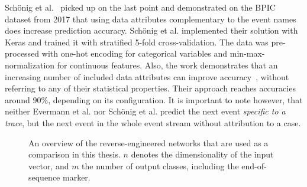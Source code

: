 Schönig et al.~\cite{schoenig2018} picked up on the last point and demonstrated on the BPIC dataset from 2017 that using data attributes complementary to the event names does increase prediction accuracy. Schönig et al. implemented their solution with Keras and trained it with stratified 5-fold cross-validation.
The data was pre-processed with one-hot encoding for categorical variables and min-max-normalization for continuous features. Also, the work demonstrates that an increasing number of included data attributes can improve accuracy~\cite[p.5]{schoenig2018}, without referring to any of their statistical properties. Their approach reaches accuracies around $90\%$, depending on its configuration. It is important to note however, that neither Evermann et al. nor Schönig et al. predict the next event \textit{specific to a trace}, but the next event in the whole event stream without attribution to a case.

\begin{figure}
\centering
{}
\qquad
{}
\caption[Overview of the reverse-engineered networks]{An overview of the reverse-engineered networks that are used as a comparison in this thesis. $n$ denotes the dimensionality of the input vector, and $m$ the number of output classes, including the end-of-sequence marker.}
\label{fig:benchmark-architectures}
\end{figure}

